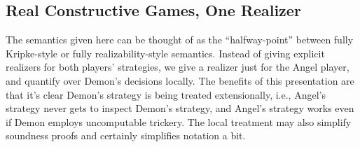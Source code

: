 \documentclass[12pt]{cmuthesis}
\theoremstyle{definition}
\theoremstyle{remark}
\begin{document}
\subsection{Real Constructive Games, One Realizer}
\newcommand*{\strategyforR}[3][]{\varsigma_{#1}^{#2}(#3)}
\newcommand*{\dstrategyforR}[3][]{\delta_{#1}^{#2}(#3)}
The semantics given here can be thought of as the ``halfway-point'' between fully Kripke-style or fully realizability-style semantics.
Instead of giving explicit realizers for both players' strategies, we give a realizer just for the Angel player, and quantify over Demon's decisions locally.
The benefits of this presentation are that it's clear Demon's strategy is being treated extensionally, i.e., Angel's strategy never gets to inspect Demon's strategy, and Angel's strategy works even if Demon employs uncomputable trickery.
The local treatment may also simplify soundness proofs and certainly simplifies notation a bit.
\end{document}
